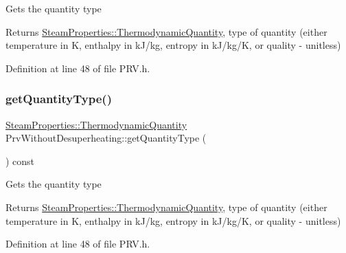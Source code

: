 Gets the quantity type

\begin{DoxyReturn}{Returns}
\hyperlink{class_steam_properties_ae0294bedf7d178c2d8fb6aed0f62fbff}{Steam\+Properties\+::\+Thermodynamic\+Quantity}, type of quantity (either temperature in K, enthalpy in k\+J/kg, entropy in k\+J/kg/K, or quality -\/ unitless) 
\end{DoxyReturn}


Definition at line 48 of file P\+R\+V.\+h.

\mbox{\label{class_prv_without_desuperheating_ad465c855f0c7271110ed2cb2ebccf081}} 
\subsubsection{\texorpdfstring{get\+Quantity\+Type()}{getQuantityType()}\hspace{0.1cm}{\footnotesize\ttfamily [3/3]}}
{\footnotesize\ttfamily \hyperlink{class_steam_properties_ae0294bedf7d178c2d8fb6aed0f62fbff}{Steam\+Properties\+::\+Thermodynamic\+Quantity} Prv\+Without\+Desuperheating\+::get\+Quantity\+Type (\begin{DoxyParamCaption}{ }\end{DoxyParamCaption}) const\hspace{0.3cm}{\ttfamily [inline]}}

Gets the quantity type

\begin{DoxyReturn}{Returns}
\hyperlink{class_steam_properties_ae0294bedf7d178c2d8fb6aed0f62fbff}{Steam\+Properties\+::\+Thermodynamic\+Quantity}, type of quantity (either temperature in K, enthalpy in k\+J/kg, entropy in k\+J/kg/K, or quality -\/ unitless) 
\end{DoxyReturn}


Definition at line 48 of file P\+R\+V.\+h.

\mbox{\label{class_prv_without_desuperheating_a1113c254f45d08588b0afe4bd1273530}} 
